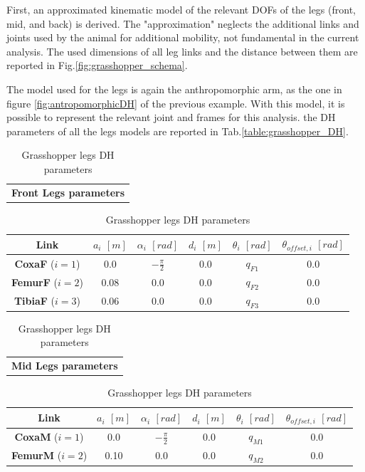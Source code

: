 First, an approximated kinematic model of the relevant DOFs of the legs (front, mid, and back) is derived.
The "approximation" neglects the additional links and joints used by the animal for additional mobility, not fundamental in the current analysis. 
The used dimensions of all leg links\cite{Grasshopper3} and the distance between them are reported in Fig.\ref{fig:grasshopper_schema}.

The model used for the legs is again the anthropomorphic arm, as the one in figure \ref{fig:antropomorphicDH} of the previous example. With this model, it is possible to represent the relevant joint and frames for this analysis. 
the DH parameters of all the legs models are reported in Tab.\ref{table:grasshopper_DH}.

\begin{table}[H]
\centering 
    \caption{Grasshopper legs DH parameters}
    \begin{tabular}{ c }
    \textbf{Front Legs parameters}
    \end{tabular}
    \begin{tabular}{| c | c | c | c | c | c |}
    \hline
    \rowcolor{bluepoli!40}
     \textbf{Link} &  $a_i$ $[m]$ & $\alpha_i$ $[rad]$ & $d_i$ $[m] $ & $\theta_i$ $[rad]$ & $\theta_{offset, i}$ $[rad]$ \T\B \\
    \hline \hline
    \textbf{CoxaF} ($i=1$) & 0.0 & $-\frac{\pi}{2}$ & 0.0  & $q_{F1}$  & 0.0 \T\B\\
    \hline 
    \textbf{FemurF} ($i=2$) & 0.08 & 0.0  & 0.0  & $q_{F2}$  & 0.0  \T\B\\
    \hline
    \textbf{TibiaF} ($i=3$) & 0.06  & 0.0  & 0.0  & $q_{F3}$ & 0.0 \T\B\\
    \hline
    \end{tabular}
    \begin{tabular}{ c }
    \\
    \textbf{Mid Legs parameters}
    \end{tabular}
    \begin{tabular}{| c | c | c | c | c | c |}
    \hline
    \rowcolor{bluepoli!40}
     \textbf{Link} &  $a_i$ $[m]$ & $\alpha_i$ $[rad]$ & $d_i$ $[m] $ & $\theta_i$ $[rad]$ & $\theta_{offset, i}$ $[rad]$ \T\B \\
    \hline \hline
    \textbf{CoxaM} ($i=1$) & 0.0 & $-\frac{\pi}{2}$ & 0.0  & $q_{M1}$  & 0.0 \T\B\\
    \hline 
    \textbf{FemurM} ($i=2$) & 0.10 & 0.0  & 0.0  & $q_{M2}$  & 0.0  \T\B\\

\end{tabular}
\end{table}
